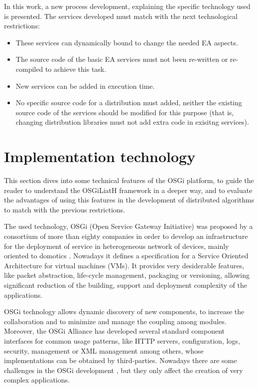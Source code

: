 \documentclass{sig-alternate}
\begin{document}
In this work, a new process development, explaining the specific technology used is presented. The services developed must match with the next technological restrictions:
\begin{itemize}
\item These services can dynamically bound to cha\-nge the needed EA aspects. 
\item The source code of  the basic EA services must not been re-written or re-compiled to achieve this task. 
\item New services can be added in execution time. 
\item No specific source code for a distribution must added, neither the existing source code of the services should be modified for this purpose (that is, changing distribution libraries must not add extra code in exisitng services).
\end{itemize}


\section{Implementation technology}
\label{sec:technology}
This section dives into some technical features of the OSGi platform, to guide the reader to understand the OSGiLiatH framework in a deeper way, and to evaluate the advantages of using this features in the development of distributed algorithms to match with the previous restrictions.

The used technology, OSGi (Open Service Gateway Initiative) \cite{OSGI} was proposed by a consortium of more than
eighty companies in order to develop an infrastructure for the
deployment of service in heterogeneous network of devices, mainly
oriented to domotics \cite{GATEWAY}. Nowadays it defines a
specification for a Service Oriented Architecture for virtual
machines (VMs). It provides very desiderable features, like
packet abstraction, life-cycle management, packaging or versioning,
allowing significant reduction of the building, support and deployment
complexity of the applications. 

OSGi technology allows dynamic discovery of new components, to increase the collaboration and to minimize and manage the coupling
among modules. Moreover, the
OSGi Alliance has developed several standard component interfaces for
common usage patterns, like HTTP servers, configuration, logs, security,
management or XML management among others, whose implementations can
be obtained by third-parties. Nowadays there are some challenges 
in the OSGi development \cite{OSGICHALLENGES}, but they only affect the creation of very complex applications.
\end{document}
